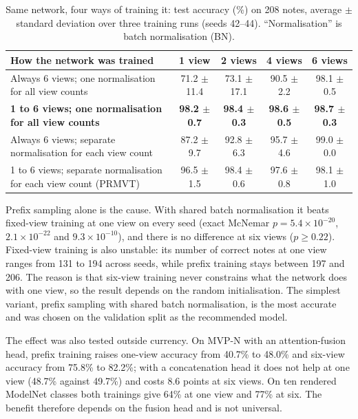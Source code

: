 \begin{table}[!htbp]
\centering
\caption{Same network, four ways of training it: test accuracy (\%) on 208 notes, average $\pm$ standard deviation over three training runs (seeds 42--44). ``Normalisation'' is batch normalisation (BN).}
\label{tab:same_arch}
\small
\begin{tabular}{|L{5.6cm}|c|c|c|c|}
\hline
\textbf{How the network was trained} & \textbf{1 view} & \textbf{2 views} & \textbf{4 views} & \textbf{6 views} \\ \hline
Always 6 views; one normalisation for all view counts & 71.2 $\pm$ 11.4 & 73.1 $\pm$ 17.1 & 90.5 $\pm$ 2.2 & 98.1 $\pm$ 0.5 \\ \hline
\textbf{1 to 6 views; one normalisation for all view counts} & \textbf{98.2 $\pm$ 0.7} & \textbf{98.4 $\pm$ 0.3} & \textbf{98.6 $\pm$ 0.5} & \textbf{98.7 $\pm$ 0.3} \\ \hline
Always 6 views; separate normalisation for each view count & 87.2 $\pm$ 9.7 & 92.8 $\pm$ 6.3 & 95.7 $\pm$ 4.6 & 99.0 $\pm$ 0.0 \\  to 6 views; separate normalisation for each view count (PRMVT) & 96.5 $\pm$ 1.5 & 98.4 $\pm$ 0.6 & 97.6 $\pm$ 0.8 & 98.1 $\pm$ 1.0 \\ \hline
\end{tabular}
\end{table}

Prefix sampling alone is the cause. With shared batch normalisation it beats fixed-view training at one view on every seed (exact McNemar $p = 5.4\times10^{-20}$, $2.1\times10^{-22}$ and $9.3\times10^{-10}$), and there is no difference at six views ($p \geq 0.22$). Fixed-view training is also unstable: its number of correct notes at one view ranges from 131 to 194 across seeds, while prefix training stays between 197 and 206. The reason is that six-view training never constrains what the network does with one view, so the result depends on the random initialisation. The simplest variant, prefix sampling with shared batch normalisation, is the most accurate and was chosen on the validation split as the recommended model.

The effect was also tested outside currency. On MVP-N \cite{mvpn} with an attention-fusion head, prefix training raises one-view accuracy from 40.7\% to 48.0\% and six-view accuracy from 75.8\% to 82.2\%; with a concatenation head it does not help at one view (48.7\% against 49.7\%) and costs 8.6 points at six views. On ten rendered ModelNet classes \cite{modelnet} both trainings give 64\% at one view and 77\% at six. The benefit therefore depends on the fusion head and is not universal.


